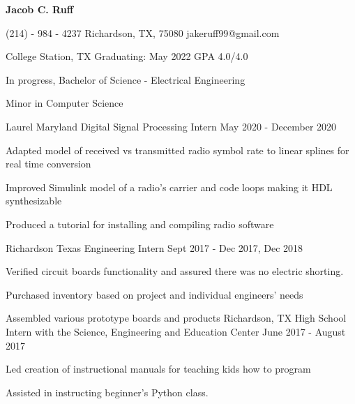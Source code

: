 \documentclass[11pt]{article} %
\begin{document}
\centerline{{\Huge \bf Jacob C. Ruff}}

\bigskip

	{(214) - 984 - 4237}
        {Richardson, TX, 75080}
        {jakeruff99@gmail.com}

\begin{description}
\squish
{}
           {College Station, TX}
           {Graduating: May 2022}
	   {GPA 4.0/4.0}


In progress, Bachelor of Science - Electrical Engineering

Minor in Computer Science

\end{description}



\begin{description}
\squish

	   {Laurel Maryland}
           {Digital Signal Processing Intern}
           {May 2020 - December 2020}

	   Adapted model of received  vs transmitted radio symbol rate to linear splines for real time conversion

	   Improved Simulink model of a radio's carrier and code loops making it HDL synthesizable

	   Produced a tutorial for installing and compiling radio software

	   {Richardson Texas}
           {Engineering Intern}
           {Sept 2017 - Dec 2017, Dec 2018}

	Verified circuit boards functionality and assured there was no electric shorting.

	Purchased inventory based on project and individual engineers' needs

	Assembled various prototype boards and products
		{Richardson, TX}
		{High School Intern with the Science, Engineering and Education Center}
		{June 2017 - August 2017}

		Led creation of instructional manuals for teaching kids how to program

		Assisted in instructing beginner's Python class.

\end{description}
\end{document}

